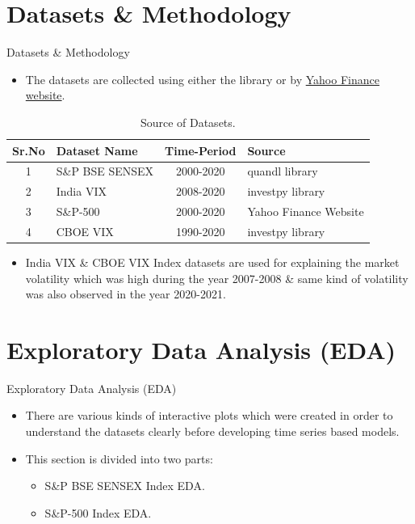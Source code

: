 \documentclass{beamer}
\begin{document}

\section{Datasets \& Methodology}
\begin{frame}{Datasets \& Methodology}
	\begin{itemize}
		\item The datasets are collected using either the library or by \href{https://cutt.ly/5b6Yn9L}{Yahoo Finance website}.
	\end{itemize}
	\begin{table}
		\begin{tabular}{c l c l}
			\toprule
			\textbf{Sr.No} & \textbf{Dataset Name} & \textbf{Time-Period} & \textbf{Source}       \\
			\midrule
			1              & S\&P BSE SENSEX       & 2000-2020            & quandl library        \\
			2              & India VIX             & 2008-2020            & investpy library      \\
			3              & S\&P-500              & 2000-2020            & Yahoo Finance Website \\
			4              & CBOE VIX              & 1990-2020            & investpy library      
			\bottomrule
		\end{tabular}
		\caption{Source of Datasets.}
	\end{table}
	\begin{itemize}
		\item India VIX \& CBOE VIX Index datasets are used for explaining the market volatility which was high during the year 2007-2008 \& same kind of volatility was also observed in the year 2020-2021.
	\end{itemize}
\end{frame}

\section{Exploratory Data Analysis (EDA)}
\begin{frame}{Exploratory Data Analysis (EDA)}
	\begin{itemize}
		\item There are various kinds of interactive plots which were created in order to understand the datasets clearly before developing time series based models.
		      \pause
		\item This section is divided into two parts:
		      \begin{itemize}
		      	\item S\&P BSE SENSEX Index EDA.
		      	\item S\&P-500 Index EDA.
		      \end{itemize}
	\end{itemize}
\end{frame}
\end{document}
